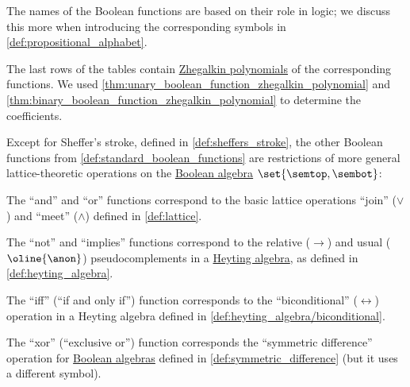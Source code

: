 \begin{definition}
  The names of the Boolean functions are based on their role in logic; we discuss this more when introducing the corresponding symbols in \cref{def:propositional_alphabet}.

  The last rows of the tables contain \hyperref[def:zhegalkin_polynomial]{Zhegalkin polynomials} of the corresponding functions. We used \cref{thm:unary_boolean_function_zhegalkin_polynomial} and \cref{thm:binary_boolean_function_zhegalkin_polynomial} to determine the coefficients.
\end{definition}

\begin{proposition}\label{thm:def:standard_boolean_functions}
  Except for Sheffer's stroke, defined in \cref{def:sheffers_stroke}, the other Boolean functions from \cref{def:standard_boolean_functions} are restrictions of more general lattice-theoretic operations on the \hyperref[def:boolean_algebra/subobject]{Boolean algebra} \( \set{ \semtop, \sembot } \):

  \begin{thmenum}
     The \enquote{and} and \enquote{or} functions correspond to the basic lattice operations \enquote{join} (\( \vee \)) and \enquote{meet} (\( \wedge \)) defined in \cref{def:lattice}.

     The \enquote{not} and \enquote{implies} functions correspond to the relative (\( \rightarrow \)) and usual (\( \oline{\anon} \)) pseudocomplements in a \hyperref[def:heyting_algebra]{Heyting algebra}, as defined in \cref{def:heyting_algebra}.

     The \enquote{iff} (\enquote{if and only if}) function corresponds to the \enquote{biconditional} (\( \leftrightarrow \)) operation in a Heyting algebra defined in \cref{def:heyting_algebra/biconditional}.

     The \enquote{xor} (\enquote{exclusive or}) function corresponds the \enquote{symmetric difference} operation for \hyperref[def:boolean_algebra]{Boolean algebras} defined in \cref{def:symmetric_difference} (but it uses a different symbol).
  \end{thmenum}
\end{proposition}
